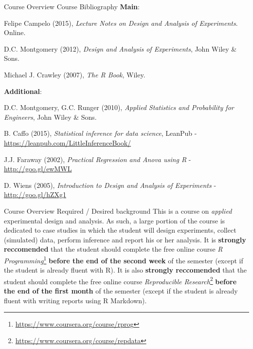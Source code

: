 \documentclass[t]{beamer}
\begin{document}

\begin{ftst}
{Course Overview}
{Course Bibliography}
\textbf{Main}:\\
{\footnotesize
\bitems Felipe Campelo (2015), \textit{Lecture Notes on Design and Analysis of Experiments}. Online.\\
\item D.C. Montgomery (2012), \textit{Design and Analysis of Experiments}, John Wiley \& Sons.
\item Michael J. Crawley (2007), \textit{The R Book}, Wiley.
\eitem}
\vhalf
\textbf{Additional}:
{\footnotesize\bitems D.C. Montgomery, G.C. Runger (2010), \textit{Applied Statistics and Probability for Engineers}, John Wiley \& Sons.
\item B. Caffo (2015), \textit{Statistical inference for data science}, LeanPub - {\small\url{https://leanpub.com/LittleInferenceBook/}}
\item J.J. Faraway (2002), \textit{Practical Regression and Anova using R} - {\small\url{http://goo.gl/ewMWL}}
\item D. Wiens (2005), \textit{Introduction to Design and Analysis of Experiments} - {\small\url{http://goo.gl/hZXg1}}
\eitem}
\end{ftst}


\begin{ftst}
{Course Overview}
{Required / Desired background}
This is a course on \textit{applied} experimental design and analysis. As such, a large portion of the course is dedicated to case studies in which the student will design experiments, collect (simulated) data, perform inference and report his or her analysis.
\vone
It is \textbf{strongly reccomended} that the student should complete the free online course  \textit{R Programming}\footnote{{\scriptsize\url{https://www.coursera.org/course/rprog}}} \textbf{before the end of the second week} of the semester (except if the student is already fluent with R).
\vone
It is also \textbf{strongly reccomended} that the student should complete the free online course  \textit{Reproducible Research}\footnote{{\scriptsize\url{https://www.coursera.org/course/repdata}}} \textbf{before the end of the first month} of the semester (except if the student is already fluent with writing reports using R Markdown).
\end{ftst}

\end{document}
